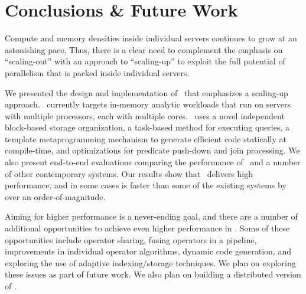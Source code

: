 
\section{Conclusions \& Future Work} \label{conclusions}
Compute and memory densities inside individual servers continues to grow at an astonishing pace. %
Thus, there is a clear need to complement the emphasis on ``scaling-out'' with an approach to ``scaling-up'' to exploit the full potential of parallelism that is packed inside individual servers. 


We presented the design and implementation of \Quickstep\ that emphasizes a scaling-up approach. \Quickstep\ currently targets in-memory analytic workloads that run on servers with multiple processors, each with multiple cores. \Quickstep\ uses a novel independent block-based storage organization, a task-based method for executing queries,  a template metaprogramming mechanism to generate efficient code statically at compile-time, and optimizations for predicate push-down and join processing. 
We also present end-to-end evaluations comparing the performance of \Quickstep\ and a number of other contemporary systems. Our results show that \Quickstep\ delivers high performance, and in some cases is faster than some of the existing systems by over an order-of-magnitude. 

Aiming for higher performance is a never-ending goal, and there are a number of additional opportunities to achieve even higher performance in \Quickstep. Some of these opportunities include operator sharing, fusing operators in a pipeline, improvements in individual operator algorithms, dynamic code generation, and exploring the use of adaptive indexing/storage techniques. We plan on exploring these issues as part of future work. We also plan on building a distributed version of \Quickstep. 

